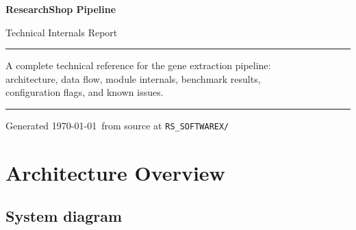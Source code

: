 \documentclass[11pt,a4paper]{article}
\begin{document}
\begin{titlepage}
  \centering
  \vspace*{3cm}
  {\huge\bfseries\color{NavyBlue} ResearchShop Pipeline}\par
  \vspace{0.5em}
  {\Large\color{SteelBlue} Technical Internals Report}\par
  \vspace{2em}
  \rule{0.6\textwidth}{1pt}\par
  \vspace{1.5em}
  {\normalsize
    A complete technical reference for the gene extraction pipeline:\\[0.4em]
    architecture, data flow, module internals, benchmark results,\\[0.4em]
    configuration flags, and known issues.
  }\par
  \vspace{2em}
  \rule{0.6\textwidth}{0.4pt}\par
  \vspace{1em}
  {\small\color{gray}Generated \today \ from source at \texttt{RS\_SOFTWAREX/}}\par
  \vfill
\end{titlepage}

\tableofcontents
\newpage

\section{Architecture Overview}

\subsection{System diagram}
\end{document}
